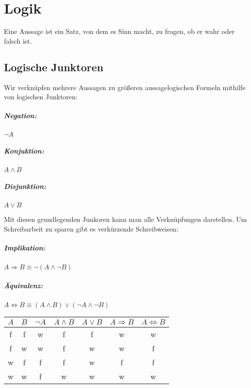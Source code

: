 \chapter{Logik}
Eine Aussage ist ein Satz, von dem es Sinn macht, zu fragen, ob er wahr oder falsch ist.

\section{Logische Junktoren}
Wir verknüpfen mehrere Aussagen zu größeren aussagelogischen Formeln mithilfe von logischen Junktoren:
  \paragraph{Negation:}
  $\neg A$

  \paragraph{Konjuktion:}
  $A \wedge B$

  \paragraph{Disjunktion:}
  $A \vee B$

	\par \medskip

Mit diesen grundlegenden Junkoren kann man alle Verknüpfungen darstellen. Um Schreibarbeit zu sparen gibt es verkürzende Schreibweisen:

\paragraph{Implikation:}
$A\Rightarrow B \equiv \neg(A\wedge \neg B)$
\paragraph{Äquivalenz:}
$A\Leftrightarrow B \equiv (A\wedge B)\vee (\neg A\wedge \neg B)$

\vspace{1em}
\begin{center}
	\renewcommand{\arraystretch}{1.2}
  \begin{tabular}{c c|c c c c c}
    $A$ & $B$ & $\neg A$ & $A \wedge B$ & $A \vee B$ & $A \Rightarrow B$ & $A \Leftrightarrow B$\\
    \hline  f & f & w & f & f & w & w \\
            f & w & w & f & w & w & f \\
            w & f & f & f & w & f & f \\
            w & w & f & w & w & w & w
  \end{tabular}
\end{center}



